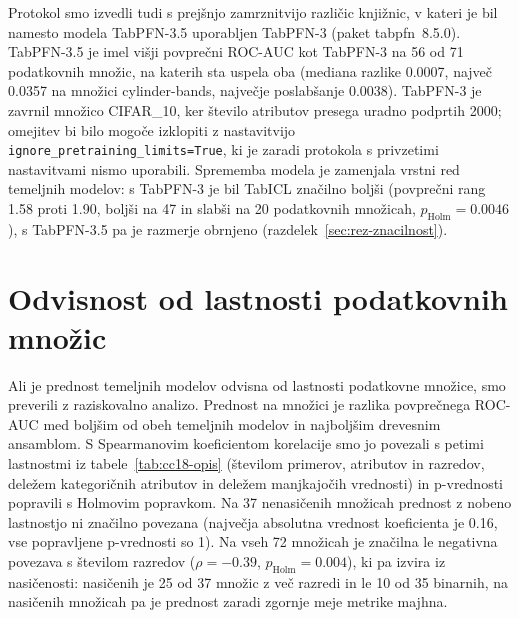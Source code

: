 \documentclass[a4paper,12pt,openright]{book}
\begin{document}
Protokol smo izvedli tudi s prejšnjo zamrznitvijo različic knjižnic, v kateri je
bil namesto modela TabPFN-3.5 uporabljen TabPFN-3 (paket tabpfn~8.5.0).
TabPFN-3.5 je imel višji povprečni ROC-AUC kot TabPFN-3 na 56 od 71 podatkovnih
množic, na katerih sta uspela oba (mediana razlike \num{0.0007}, največ
\num{0.0357} na množici cylinder-bands, največje poslabšanje \num{0.0038}).
TabPFN-3 je zavrnil množico CIFAR\_10, ker število atributov presega uradno
podprtih 2000; omejitev bi bilo mogoče izklopiti z nastavitvijo
\texttt{ignore\_pretraining\_limits=True}, ki je zaradi protokola s privzetimi
nastavitvami nismo uporabili. Sprememba modela je zamenjala vrstni red
temeljnih modelov: s TabPFN-3 je bil TabICL značilno boljši (povprečni rang
\num{1.58} proti \num{1.90}, boljši na 47 in slabši na 20 podatkovnih
množicah, $p_\mathrm{Holm} = \num{0.0046}$), s TabPFN-3.5 pa je razmerje
obrnjeno (razdelek~\ref{sec:rez-znacilnost}).

\section{Odvisnost od lastnosti podatkovnih množic}
\label{sec:rez-lastnosti}

Ali je prednost temeljnih modelov odvisna od lastnosti podatkovne množice, smo
preverili z raziskovalno analizo. Prednost na množici je razlika povprečnega
ROC-AUC med boljšim od obeh temeljnih modelov in najboljšim drevesnim
ansamblom. S Spearmanovim koeficientom korelacije smo jo povezali s petimi
lastnostmi iz tabele~\ref{tab:cc18-opis} (številom primerov, atributov in
razredov, deležem kategoričnih atributov in deležem manjkajočih vrednosti) in
p-vrednosti popravili s Holmovim popravkom. Na 37 nenasičenih množicah
prednost z nobeno lastnostjo ni značilno povezana (največja absolutna vrednost
koeficienta je \num{0.16}, vse popravljene p-vrednosti so 1). Na vseh 72
množicah je značilna le negativna povezava s številom razredov ($\rho =
\num{-0.39}$, $p_\mathrm{Holm} = \num{0.004}$), ki pa izvira iz nasičenosti:
nasičenih je 25 od 37 množic z več razredi in le 10 od 35 binarnih, na
nasičenih množicah pa je prednost zaradi zgornje meje metrike majhna.
\end{document}
